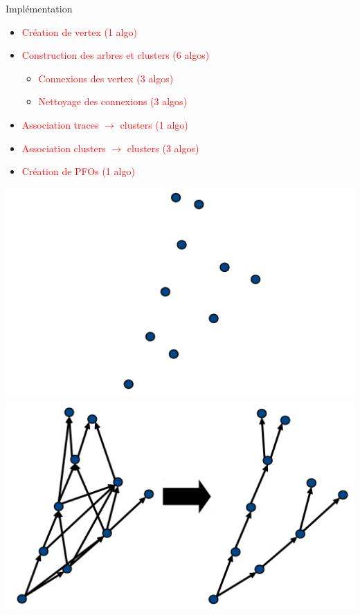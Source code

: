 \documentclass[8pt]{beamer}
\begin{document}
\begin{frame}
    \pause
    \begin{minipage}{0.6\linewidth}
      \begin{block}{Implémentation}
        \begin{itemize}
          \item \textcolor<2>{red}{Création de vertex (1 algo)}
          \item \textcolor<3,7>{red}{Construction des arbres et clusters (6 algos)}
          \begin{itemize}
            \item \textcolor<3,7>{red}{Connexions des vertex (3 algos)}
            \item \textcolor<3,7>{red}{Nettoyage des connexions (3 algos)}
          \end{itemize}
          \item \textcolor<4>{red}{Association traces $\rightarrow$ clusters (1 algo)}
          \item \textcolor<5>{red}{Association clusters $\rightarrow$ clusters (3 algos)}
          \item \textcolor<6>{red}{Création de PFOs (1 algo)}
        \end{itemize}
      \end{block}
    \end{minipage}
    \begin{minipage}{0.39\linewidth}
      \begin{overprint}
         \centering \includegraphics[width=0.8\linewidth]{VertexCreationIntro.pdf}
         \centering \includegraphics[width=0.8\linewidth]{ConnectCleanIntro.pdf}

\end{overprint}
\end{minipage}
\end{frame}
\end{document}
